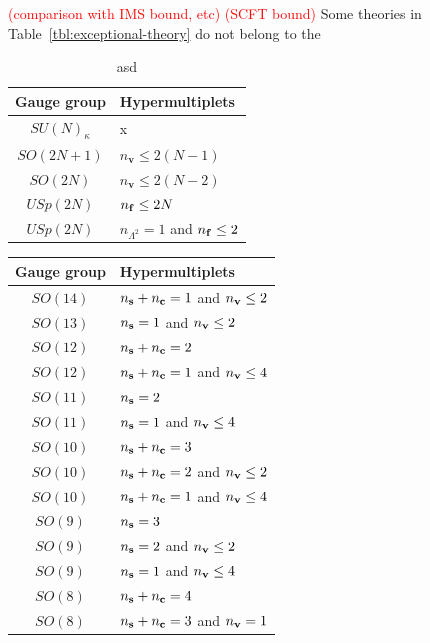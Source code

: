 \documentclass[letterpaper, 11pt]{article}
\begin{document}
{\textcolor{red}{(comparison with IMS bound, etc) (SCFT bound)} 
Some theories in Table~\ref{tbl:exceptional-theory} do not belong to the 

\begin{table}[tbp]
  \centering
  \begin{tabular}{@{}cl@{}}
    \toprule
    Gauge group  & Hypermultiplets    \\ \midrule
    $SU(N)_\kappa$ &x                               \\
    $SO(2N+1)$ & $n_{\mathbf{v}} \leq 2(N-1)$ \\
    $SO(2N)$   & $n_{\mathbf{v}} \leq 2(N-2)$ \\
    $USp(2N)$  & $n_{\bf f} \leq 2N$ \\
    $USp(2N)$  & $n_{\Lambda^2} = 1$ and $n_{\bf f} \leq 2$ \\ \bottomrule
    \end{tabular}
    \caption{asd}
    \label{tbl:infinite-theory}
\end{table}
\begin{table}[tbp]
  \centering
  \begin{tabular}{@{}cl@{}}
    \toprule
    Gauge group  & Hypermultiplets    \\  \midrule
    $SO(14)$  & $n_{\bf s} + n_{\bf c} = 1$ and $n_{\bf v}  \leq 2$ \\
    $SO(13)$  & $n_{\bf s} = 1$ and $n_{\bf v}  \leq 2$ \\
    $SO(12)$  & $n_{\bf s} + n_{\bf c} = 2$ \\
    $SO(12)$  & $n_{\bf s} + n_{\bf c} = 1$ and  $n_{\bf v}  \leq 4$\\
    $SO(11)$  & $n_{\bf s}= 2$ \\
    $SO(11)$  & $n_{\bf s}= 1$ and  $n_{\bf v}  \leq 4$\\
    $SO(10)$  & $n_{\bf s} + n_{\bf c} = 3$ \\
    $SO(10)$  & $n_{\bf s} + n_{\bf c} = 2$ and  $n_{\bf v}  \leq 2$\\
    $SO(10)$  & $n_{\bf s} + n_{\bf c} = 1$ and  $n_{\bf v}  \leq 4$\\
    $SO(9)$  & $n_{\bf s}  = 3$ \\
    $SO(9)$  & $n_{\bf s}  = 2$ and  $n_{\bf v}  \leq 2$\\
    $SO(9)$  & $n_{\bf s} = 1$ and  $n_{\bf v}  \leq 4$\\
    $SO(8)$  & $n_{\bf s} + n_{\bf c} = 4$ \\
    $SO(8)$  & $n_{\bf s} + n_{\bf c} = 3$ and  $n_{\bf v}  =1$\\

\end{tabular}
\end{table}}
\end{document}
